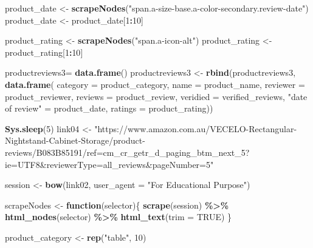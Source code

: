 \documentclass[
]{article}
\newenvironment{Shaded}{\begin{snugshade}}{\end{snugshade}}
\newcommand{\AttributeTok}[1]{\textcolor[rgb]{0.13,0.29,0.53}{#1}}
\newcommand{\ConstantTok}[1]{\textcolor[rgb]{0.56,0.35,0.01}{#1}}
\newcommand{\ControlFlowTok}[1]{\textcolor[rgb]{0.13,0.29,0.53}{\textbf{#1}}}
\newcommand{\DecValTok}[1]{\textcolor[rgb]{0.00,0.00,0.81}{#1}}
\newcommand{\FunctionTok}[1]{\textcolor[rgb]{0.13,0.29,0.53}{\textbf{#1}}}
\newcommand{\NormalTok}[1]{#1}
\newcommand{\OtherTok}[1]{\textcolor[rgb]{0.56,0.35,0.01}{#1}}
\newcommand{\SpecialCharTok}[1]{\textcolor[rgb]{0.81,0.36,0.00}{\textbf{#1}}}
\newcommand{\StringTok}[1]{\textcolor[rgb]{0.31,0.60,0.02}{#1}}
\begin{document}
\begin{Shaded}
\begin{Highlighting}[]
\NormalTok{  product\_date }\OtherTok{\textless{}{-}} \FunctionTok{scrapeNodes}\NormalTok{(}\StringTok{"span.a{-}size{-}base.a{-}color{-}secondary.review{-}date"}\NormalTok{)}
\NormalTok{  product\_date }\OtherTok{\textless{}{-}}\NormalTok{ product\_date[}\DecValTok{1}\SpecialCharTok{:}\DecValTok{10}\NormalTok{]}
  
\NormalTok{  product\_rating }\OtherTok{\textless{}{-}} \FunctionTok{scrapeNodes}\NormalTok{(}\StringTok{"span.a{-}icon{-}alt"}\NormalTok{)}
\NormalTok{  product\_rating }\OtherTok{\textless{}{-}}\NormalTok{ product\_rating[}\DecValTok{1}\SpecialCharTok{:}\DecValTok{10}\NormalTok{]}
  
\NormalTok{  productreviews3}\OtherTok{=} \FunctionTok{data.frame}\NormalTok{()}
\NormalTok{  productreviews3 }\OtherTok{\textless{}{-}} \FunctionTok{rbind}\NormalTok{(productreviews3, }\FunctionTok{data.frame}\NormalTok{(}
                      \AttributeTok{category =}\NormalTok{ product\_category,}
                      \AttributeTok{name =}\NormalTok{ product\_name,}
                      \AttributeTok{reviewer =}\NormalTok{ product\_reviewer,}
                      \AttributeTok{reviews =}\NormalTok{ product\_review,}
                      \AttributeTok{veridied =}\NormalTok{ verified\_reviews,}
                      \StringTok{"date of review"} \OtherTok{=}\NormalTok{ product\_date,}
                      \AttributeTok{ratings =}\NormalTok{ product\_rating))}
  
   \FunctionTok{Sys.sleep}\NormalTok{(}\DecValTok{5}\NormalTok{)}
\NormalTok{link04 }\OtherTok{\textless{}{-}} \StringTok{"https://www.amazon.com.au/VECELO{-}Rectangular{-}Nightstand{-}Cabinet{-}Storage/product{-}reviews/B083B85191/ref=cm\_cr\_getr\_d\_paging\_btm\_next\_5?ie=UTF8\&reviewerType=all\_reviews\&pageNumber=5"}


\NormalTok{  session }\OtherTok{\textless{}{-}} \FunctionTok{bow}\NormalTok{(link02,}
               \AttributeTok{user\_agent =} \StringTok{"For Educational Purpose"}\NormalTok{)}

\NormalTok{  scrapeNodes }\OtherTok{\textless{}{-}} \ControlFlowTok{function}\NormalTok{(selector)\{}
    \FunctionTok{scrape}\NormalTok{(session) }\SpecialCharTok{\%\textgreater{}\%}
      \FunctionTok{html\_nodes}\NormalTok{(selector) }\SpecialCharTok{\%\textgreater{}\%}
      \FunctionTok{html\_text}\NormalTok{(}\AttributeTok{trim =} \ConstantTok{TRUE}\NormalTok{)}
\NormalTok{  \}}

\NormalTok{  product\_category }\OtherTok{\textless{}{-}} \FunctionTok{rep}\NormalTok{(}\StringTok{"table"}\NormalTok{, }\DecValTok{10}\NormalTok{)}


\end{Highlighting}
\end{Shaded}
\end{document}
